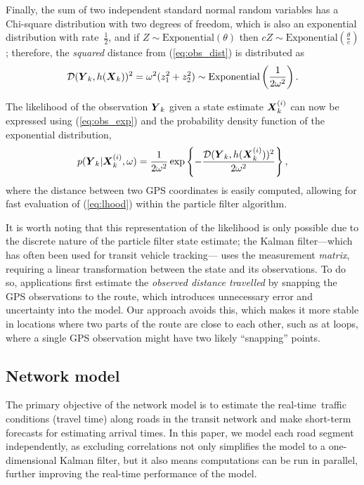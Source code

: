 \documentclass[times, doublespace]{anzsauth}
\newcommand{\rt}{real-time\ }
\begin{document}
Finally, the sum of two independent
standard normal random variables has a Chi-square distribution with two degrees of freedom,
which is also an exponential distribution with rate~$\frac{1}{2}$,
and if $Z \sim \mathrm{Exponential}(\theta)$ then
$cZ \sim \mathrm{Exponential}(\frac{\theta}{c})$;
therefore, the \emph{squared} distance from (\ref{eq:obs_dist}) is distributed as
\begin{equation}
\label{eq:obs_exp}
\mathcal{D}(\mbox{$\boldsymbol{Y}$}_k, h(\mbox{$\boldsymbol{X}$}_k))^2 =
\omega^2(z_1^2 + z_2^2) \sim \mathrm{Exponential}\left(\frac{1}{2\omega^2}\right).
\end{equation}

The likelihood of the observation $\mbox{$\boldsymbol{Y}$}_k$ given a state estimate $\mbox{$\boldsymbol{X}$}_k^{(i)}$
can now be expressed using (\ref{eq:obs_exp})
and the probability density function of the exponential distribution,
\begin{equation}
\label{eq:lhood}
p(\mbox{$\boldsymbol{Y}$}_k | \mbox{$\boldsymbol{X}$}_k^{(i)}, \omega) =
\frac{1}{2\omega^2}\exp\left\{
    -\frac{\mathcal{D}(\mbox{$\boldsymbol{Y}$}_k, h(\mbox{$\boldsymbol{X}$}_k^{(i)}))^2}{2\omega^2}
\right\},
\end{equation}
where the distance between two GPS coordinates is easily computed,
allowing for fast evaluation of (\ref{eq:lhood}) within the particle filter algorithm.


It is worth noting that this representation of the likelihood is only
possible due to the discrete nature of the particle filter state estimate;
the Kalman filter---which has often been used for transit vehicle tracking---%
uses the measurement \emph{matrix}, requiring a linear
transformation between the state and its observations.
To do so, applications first estimate the \emph{observed distance travelled}
by snapping the GPS observations to the route,
which introduces unnecessary error and uncertainty into the model.
Our approach avoids this, which makes it more stable in locations where two
parts of the route are close to each other,
such as at loops, where a single GPS observation might have two likely ``snapping'' points.


\subsection{Network model}
\label{sec:kf}

The primary objective of the network model is to estimate the \rt traffic conditions
(travel time) along roads in the transit network
and make short-term forecasts for estimating arrival times.
In this paper, we model each road segment independently,
as excluding correlations not only simplifies the model to a one-dimensional Kalman filter,
but it also means computations can be run in parallel,
further improving the real-time performance of the model.
\end{document}
